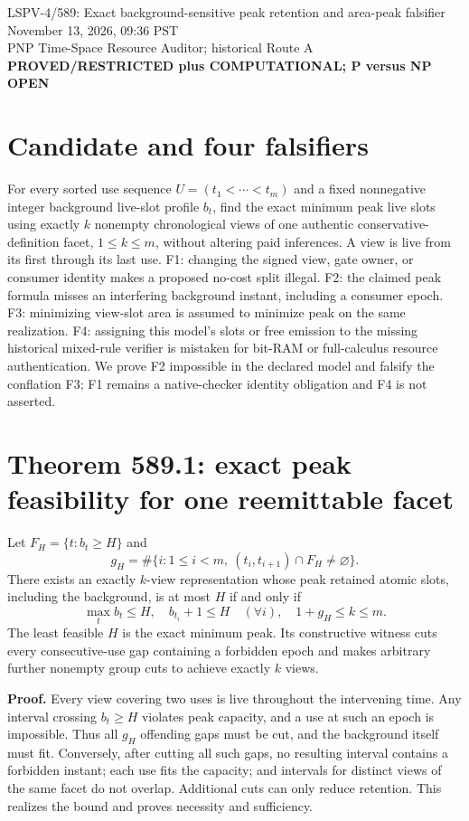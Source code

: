 \documentclass[11pt]{article}
\begin{document}
\begin{center}
{\Large LSPV-4/589: Exact background-sensitive peak retention and area-peak falsifier}\\
November 13, 2026, 09:36 PST\\
PNP Time-Space Resource Auditor; historical Route A\\
\textbf{PROVED/RESTRICTED plus COMPUTATIONAL; P versus NP OPEN}
\end{center}

\section*{Candidate and four falsifiers}
For every sorted use sequence $U=(t_1<\cdots<t_m)$ and a fixed nonnegative integer background live-slot profile $b_t$, find the exact minimum peak live slots using exactly $k$ nonempty chronological views of one authentic conservative-definition facet, $1\le k\le m$, without altering paid inferences. A view is live from its first through its last use. F1: changing the signed view, gate owner, or consumer identity makes a proposed no-cost split illegal. F2: the claimed peak formula misses an interfering background instant, including a consumer epoch. F3: minimizing view-slot area is assumed to minimize peak on the same realization. F4: assigning this model's slots or free emission to the missing historical mixed-rule verifier is mistaken for bit-RAM or full-calculus resource authentication. We prove F2 impossible in the declared model and falsify the conflation F3; F1 remains a native-checker identity obligation and F4 is not asserted.

\section*{Theorem 589.1: exact peak feasibility for one reemittable facet}
Let $F_H=\{t:b_t\ge H\}$ and
\[
g_H=\#\{i:1\le i<m,\ (t_i,t_{i+1})\cap F_H\ne\varnothing\}.
\]
There exists an exactly $k$-view representation whose peak retained atomic slots, including the background, is at most $H$ if and only if
\[
\boxed{\max_t b_t\le H,\quad b_{t_i}+1\le H\quad(\forall i),
\quad 1+g_H\le k\le m.}
\]
The least feasible $H$ is the exact minimum peak. Its constructive witness cuts every consecutive-use gap containing a forbidden epoch and makes arbitrary further nonempty group cuts to achieve exactly $k$ views.

\textbf{Proof.} Every view covering two uses is live throughout the intervening time. Any interval crossing $b_t\ge H$ violates peak capacity, and a use at such an epoch is impossible. Thus all $g_H$ offending gaps must be cut, and the background itself must fit. Conversely, after cutting all such gaps, no resulting interval contains a forbidden instant; each use fits the capacity; and intervals for distinct views of the same facet do not overlap. Additional cuts can only reduce retention. This realizes the bound and proves necessity and sufficiency.
\end{document}
